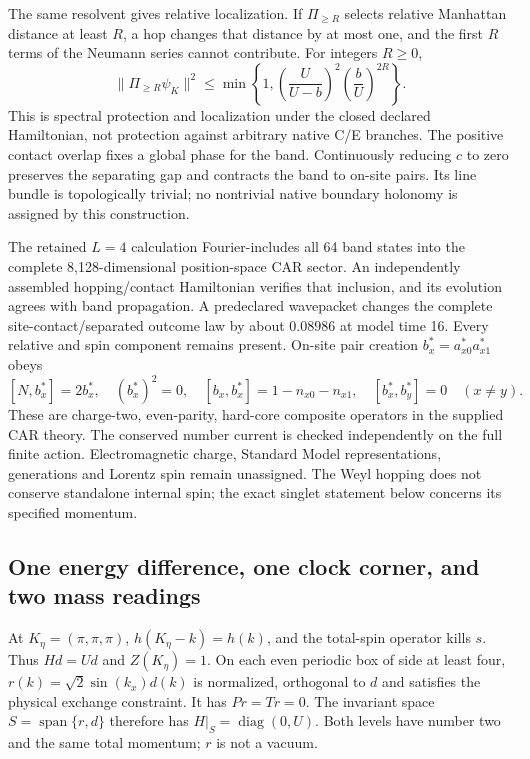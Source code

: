 The same resolvent gives relative localization. If $\Pi_{\ge R}$ selects
relative Manhattan distance at least $R$, a hop changes that distance by at
most one, and the first $R$ terms of the Neumann series cannot contribute.
For integers $R\ge0$,
\[
 \|\Pi_{\ge R}\psi_K\|^2\le
 \min\left\{1,\left(\frac{U}{U-b}\right)^2
                    \left(\frac bU\right)^{2R}\right\}.
\]
This is spectral protection and localization under the closed declared
Hamiltonian, not protection against arbitrary native C/E branches.
The positive contact overlap fixes a global phase for the band. Continuously
reducing $c$ to zero preserves the separating gap and contracts the band to
on-site pairs. Its line bundle is topologically trivial; no nontrivial
native boundary holonomy is assigned by this construction.

The retained $L=4$ calculation Fourier-includes all 64 band states into
the complete 8,128-dimensional position-space CAR sector. An independently
assembled hopping/contact Hamiltonian verifies that inclusion, and its
evolution agrees with band propagation. A predeclared wavepacket changes
the complete site-contact/separated outcome law by about $0.08986$ at model
time 16. Every relative and spin component remains present. On-site pair
creation $b_x^*=a_{x0}^*a_{x1}^*$ obeys
\[
 [N,b_x^*]=2b_x^*,\quad (b_x^*)^2=0,\quad
 [b_x,b_x^*]=1-n_{x0}-n_{x1},\quad [b_x^*,b_y^*]=0\quad(x\ne y).
\]
These are charge-two, even-parity, hard-core composite operators in the
supplied CAR theory. The conserved number current is checked independently
on the full finite action. Electromagnetic charge, Standard Model
representations, generations and Lorentz spin remain unassigned. The
Weyl hopping does not conserve standalone internal spin; the exact singlet
statement below concerns its specified momentum.

\subsection{One energy difference, one clock corner, and two mass readings}
At $K_\eta=(\pi,\pi,\pi)$, $h(K_\eta-k)=h(k)$, and the total-spin
operator kills $s$. Thus $Hd=Ud$ and $Z(K_\eta)=1$. On each even periodic
box of side at least four, $r(k)=\sqrt2\sin(k_x)d(k)$ is normalized,
orthogonal to $d$ and satisfies the physical exchange constraint. It has
$Pr=Tr=0$. The invariant space $S=\operatorname{span}\{r,d\}$ therefore
has $H|_S=\operatorname{diag}(0,U)$. Both levels have number two and the
same total momentum; $r$ is not a vacuum.


